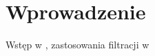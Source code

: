 \chapter{Wprowadzenie}
\label{cha:wprowadzenie}
Wstęp w \cite{Crisan}, zastosowania filtracji w \cite[]{Sarka}